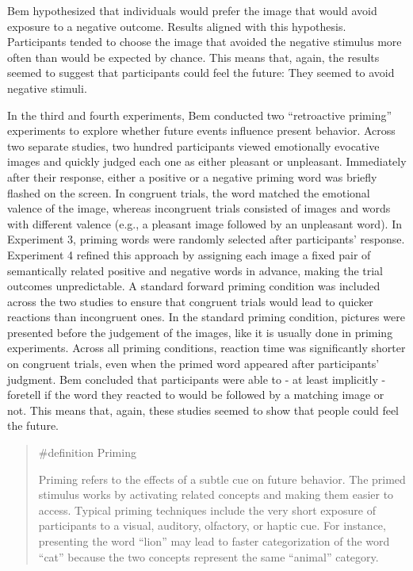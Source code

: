 \documentclass[
  letterpaper,
]{book}
\begin{document}
Bem hypothesized that individuals would prefer the image that would
avoid exposure to a negative outcome. Results aligned with this
hypothesis. Participants tended to choose the image that avoided the
negative stimulus more often than would be expected by chance. This
means that, again, the results seemed to suggest that participants could
feel the future: They seemed to avoid negative stimuli.

In the third and fourth experiments, Bem conducted two ``retroactive
priming'' experiments to explore whether future events influence present
behavior. Across two separate studies, two hundred participants viewed
emotionally evocative images and quickly judged each one as either
pleasant or unpleasant. Immediately after their response, either a
positive or a negative priming word was briefly flashed on the screen.
In congruent trials, the word matched the emotional valence of the
image, whereas incongruent trials consisted of images and words with
different valence (e.g., a pleasant image followed by an unpleasant
word). In Experiment 3, priming words were randomly selected after
participants' response. Experiment 4 refined this approach by assigning
each image a fixed pair of semantically related positive and negative
words in advance, making the trial outcomes unpredictable. A standard
forward priming condition was included across the two studies to ensure
that congruent trials would lead to quicker reactions than incongruent
ones. In the standard priming condition, pictures were presented before
the judgement of the images, like it is usually done in priming
experiments. Across all priming conditions, reaction time was
significantly shorter on congruent trials, even when the primed word
appeared after participants' judgment. Bem concluded that participants
were able to - at least implicitly - foretell if the word they reacted
to would be followed by a matching image or not. This means that, again,
these studies seemed to show that people could feel the future.

\begin{quote}
\label{def-priming}{\#definition} Priming

Priming refers to the effects of a subtle cue on future behavior. The
primed stimulus works by activating related concepts and making them
easier to access. Typical priming techniques include the very short
exposure of participants to a visual, auditory, olfactory, or haptic
cue. For instance, presenting the word ``lion'' may lead to faster
categorization of the word ``cat'' because the two concepts represent
the same ``animal'' category.
\end{quote}
\end{document}
